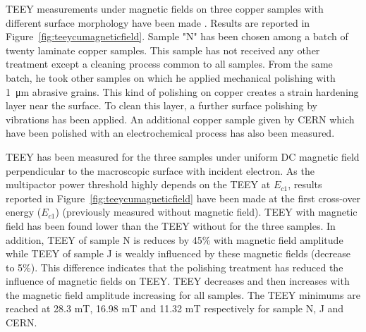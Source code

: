 TEEY measurements under magnetic fields on three copper samples with different surface morphology have been made . Results are reported in Figure~\ref{fig:teeycumagneticfield}. Sample 
"N" has been chosen among a batch of twenty laminate copper samples. This sample has not received
any other treatment except a cleaning process common to all samples. From the same batch, he took other samples on which he applied mechanical polishing with 1~\si{\micro m} abrasive grains. This kind of polishing on copper creates a strain hardening layer near the surface. To clean this layer, a further surface polishing by vibrations has been applied. An additional copper sample given by CERN which have been polished with an electrochemical process has also been measured. 

TEEY has been measured for the three samples under uniform DC magnetic field perpendicular to the macroscopic surface with incident electron. As the multipactor power threshold highly depends on the TEEY at $E_{c1}$, results reported in Figure~\ref{fig:teeycumagneticfield} have been made at the first cross-over energy ($E_{c1}$) (previously measured without magnetic field). TEEY with magnetic field has been found lower than the TEEY without for the three samples. In addition, TEEY of sample N is reduces by 45\% with magnetic field amplitude while TEEY of sample J is weakly influenced by these magnetic fields (decrease to 5\%). This difference indicates that the polishing treatment has reduced the influence of magnetic fields on TEEY. TEEY decreases and then increases with the magnetic field amplitude increasing for all samples. The TEEY minimums are reached at 28.3 mT, 16.98 mT and 11.32 mT respectively for sample N, J and CERN. 

